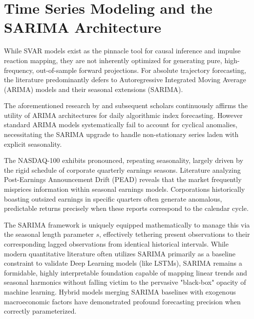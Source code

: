 \documentclass[12pt,a4paper]{report}
\begin{document}
\section{Time Series Modeling and the SARIMA Architecture}
While SVAR models exist as the pinnacle tool for causal inference and impulse reaction mapping, they are not inherently optimized for generating pure, high-frequency, out-of-sample forward projections. For absolute trajectory forecasting, the literature predominantly defers to Autoregressive Integrated Moving Average (ARIMA) models and their seasonal extensions (SARIMA).

The aforementioned research by \citet{alshiab2006predictability} and subsequent scholars continuously affirms the utility of ARIMA architectures for daily algorithmic index forecasting. However standard ARIMA models systematically fail to account for cyclical anomalies, necessitating the SARIMA upgrade to handle non-stationary series laden with explicit seasonality. 

The NASDAQ-100 exhibits pronounced, repeating seasonality, largely driven by the rigid schedule of corporate quarterly earnings seasons. Literature analyzing Post-Earnings Announcement Drift (PEAD) reveals that the market frequently misprices information within seasonal earnings models. Corporations historically boasting outsized earnings in specific quarters often generate anomalous, predictable returns precisely when these reports correspond to the calendar cycle. 

The SARIMA framework is uniquely equipped mathematically to manage this via the seasonal length parameter $s$, effectively tethering present observations to their corresponding lagged observations from identical historical intervals. While modern quantitative literature often utilizes SARIMA primarily as a baseline constraint to validate Deep Learning models (like LSTMs), SARIMA remains a formidable, highly interpretable foundation capable of mapping linear trends and seasonal harmonics without falling victim to the pervasive "black-box" opacity of machine learning. Hybrid models merging SARIMA baselines with exogenous macroeconomic factors have demonstrated profound forecasting precision when correctly parameterized.
\end{document}
